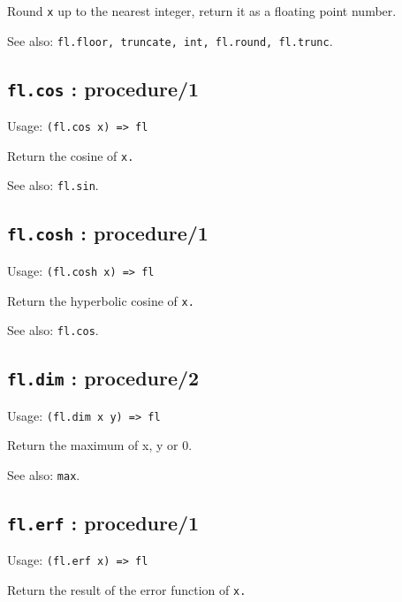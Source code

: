 \documentclass[
]{article}
\newcommand{\passthrough}[1]{#1}
\begin{document}
Round \passthrough{\lstinline!x!} up to the nearest integer, return it
as a floating point number.

See also:
\passthrough{\lstinline!fl.floor, truncate, int, fl.round, fl.trunc!}.

\hypertarget{fl.cos-procedure1-1}{%
\subsection{\texorpdfstring{\texttt{fl.cos} :
procedure/1}{fl.cos : procedure/1}}\label{fl.cos-procedure1-1}}

Usage: \passthrough{\lstinline!(fl.cos x) => fl!}

Return the cosine of \passthrough{\lstinline!x.!}

See also: \passthrough{\lstinline!fl.sin!}.

\hypertarget{fl.cosh-procedure1-1}{%
\subsection{\texorpdfstring{\texttt{fl.cosh} :
procedure/1}{fl.cosh : procedure/1}}\label{fl.cosh-procedure1-1}}

Usage: \passthrough{\lstinline!(fl.cosh x) => fl!}

Return the hyperbolic cosine of \passthrough{\lstinline!x.!}

See also: \passthrough{\lstinline!fl.cos!}.

\hypertarget{fl.dim-procedure2-1}{%
\subsection{\texorpdfstring{\texttt{fl.dim} :
procedure/2}{fl.dim : procedure/2}}\label{fl.dim-procedure2-1}}

Usage: \passthrough{\lstinline!(fl.dim x y) => fl!}

Return the maximum of x, y or 0.

See also: \passthrough{\lstinline!max!}.

\hypertarget{fl.erf-procedure1-1}{%
\subsection{\texorpdfstring{\texttt{fl.erf} :
procedure/1}{fl.erf : procedure/1}}\label{fl.erf-procedure1-1}}

Usage: \passthrough{\lstinline!(fl.erf x) => fl!}

Return the result of the error function of \passthrough{\lstinline!x.!}
\end{document}
